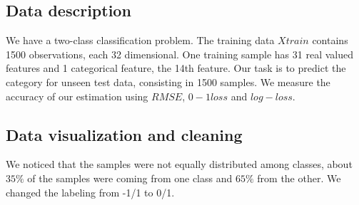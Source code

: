 \documentclass{article} %
\begin{document}
\subsection{Data description}
We have a two-class classification problem. The training data $Xtrain$ contains 1500 observations, each 32 dimensional. One training sample has 31 real valued features and 1 categorical feature, the 14th feature. Our task is to predict the category for unseen test data, consisting in 1500 samples. We measure the accuracy of our estimation using $RMSE$, $0-1 loss$ and $log-loss$. 

\subsection{Data visualization and cleaning}
We noticed that the samples were not equally distributed among classes, about $35\%$ of the samples were coming from one class and $65\%$ from the other. We changed the labeling from -1/1 to 0/1. 
\end{document}
